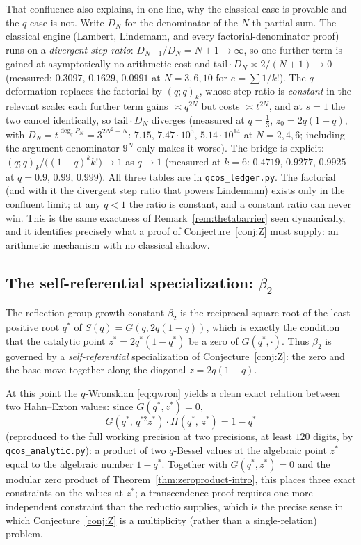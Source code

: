 \documentclass[11pt]{article}
\theoremstyle{plain}
\theoremstyle{definition}
\theoremstyle{remark}
\begin{document}
That confluence also explains, in one line, why the classical case is provable and the $q$-case is
not. Write $D_N$ for the denominator of the $N$-th partial sum. The classical engine (Lambert,
Lindemann, and every factorial-denominator proof) runs on a \emph{divergent step ratio}:
$D_{N+1}/D_N=N+1\to\infty$, so one further term is gained at asymptotically no arithmetic cost and
$\text{tail}\cdot D_N\asymp2/(N+1)\to0$ (measured: $0.3097,\,0.1629,\,0.0991$ at $N=3,6,10$ for
$e=\sum1/k!$). The $q$-deformation replaces the factorial by $(q;q)_k$, whose step ratio is
\emph{constant} in the relevant scale: each further term gains $\asymp q^{2N}$ but costs
$\asymp t^{2N}$, and at $s=1$ the two cancel identically, so $\text{tail}\cdot D_N$ diverges
(measured at $q=\tfrac13$, $z_0=2q(1-q)$, with $D_N=t^{\deg_qP_N}=3^{2N^2+N}$:
$7.15,\,7.47\cdot10^5,\,5.14\cdot10^{14}$ at $N=2,4,6$; including the argument denominator $9^N$
only makes it worse). The bridge is explicit:
$(q;q)_k/\bigl((1-q)^kk!\bigr)\to1$ as $q\to1$ (measured at $k=6$: $0.4719,\,0.9277,\,0.9925$ at
$q=0.9,\,0.99,\,0.999$). All three tables are in \texttt{qcos\_ledger.py}. The factorial (and with it the divergent step ratio that powers
Lindemann) exists only in the confluent limit; at any $q<1$ the ratio is constant, and a constant
ratio can never win. This is the same exactness of Remark~\ref{rem:thetabarrier} seen dynamically,
and it identifies precisely what a proof of Conjecture~\ref{conj:Z} must supply: an arithmetic
mechanism with no classical shadow.

\subsection{The self-referential specialization: $\beta_2$}
The reflection-group growth constant $\beta_2$ is the reciprocal square root of the least positive root
$q^\ast$ of $S(q)=G(q,2q(1-q))$, which is exactly the condition that the catalytic point
$z^\ast=2q^\ast(1-q^\ast)$ be a zero of $G(q^\ast,\cdot)$. Thus $\beta_2$ is governed by a
\emph{self-referential} specialization of Conjecture~\ref{conj:Z}: the zero and the base move together
along the diagonal $z=2q(1-q)$.

At this point the $q$-Wronskian \eqref{eq:qwron} yields a clean exact relation between two Hahn--Exton
values: since $G(q^\ast,z^\ast)=0$,
\begin{equation}\label{eq:wron-zero}
   G(q^\ast,\,q^{\ast2}z^\ast)\cdot H(q^\ast,\,z^\ast)=1-q^\ast
\end{equation}
(reproduced to the full working precision at two precisions, at least $120$ digits,
by \texttt{qcos\_analytic.py}): a product of two $q$-Bessel values at the algebraic point $z^\ast$ equal
to the algebraic number $1-q^\ast$. Together with $G(q^\ast,z^\ast)=0$ and the modular zero product of
Theorem~\ref{thm:zeroproduct-intro}, this places three exact constraints on the values at $z^\ast$; a
transcendence proof requires one more independent constraint than the reductio supplies, which is the
precise sense in which Conjecture~\ref{conj:Z} is a multiplicity (rather than a single-relation)
problem.
\end{document}
